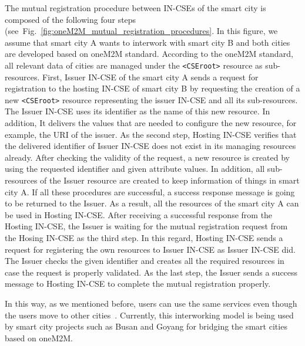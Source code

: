 The mutual registration procedure between IN-CSEs of the smart city is composed of the following four steps (see~Fig.~\ref{fig:oneM2M_mutual_registration_procedures}. In this figure, we assume that smart city A wants to interwork with smart city B and both cities are developed based on oneM2M standard. According to the oneM2M standard, all relevant data of cities are managed under the \texttt{<CSEroot>} resource as sub-resources. First, Issuer IN-CSE of the smart city A sends a request for registration to the hosting IN-CSE of smart city B by requesting the creation of a new \texttt{<CSEroot>} resource representing the issuer IN-CSE and all its sub-resources. The Issuer IN-CSE uses its identifier as the name of this new resource. In addition, It delivers the values that are needed to configure the new resource, for example, the URI of the issuer. As the second step, Hosting IN-CSE verifies that the delivered identifier of Issuer IN-CSE does not exist in its managing resources already. After checking the validity of the request, a new resource is created by using the requested identifier and given attribute values. In addition, all sub-resources of the Issuer resource are created to keep information of things in smart city A. If all these procedures are successful, a success response message is going to be returned to the Issuer. As a result, all the resources of the smart city A can be used in Hosting IN-CSE. After receiving a successful response from the Hosting IN-CSE, the Issuer is waiting for the mutual registration request from the Hosing IN-CSE as the third step. In this regard, Hosting IN-CSE sends a request for registering the own resources to Issuer IN-CSE as Issuer IN-CSE did. The Issuer checks the given identifier and creates all the required resources in case the request is properly validated. As the last step, the Issuer sends a success message to Hosting IN-CSE to complete the mutual registration properly.

In this way, as we mentioned before, users can use the same services even though the users move to other cities~\cite{kim2016standard, 2016funtionalarchonem2m, 2016applicationguidem2m}. Currently, this interworking model is being used by smart city projects such as Busan and Goyang for bridging the smart cities based on oneM2M.

